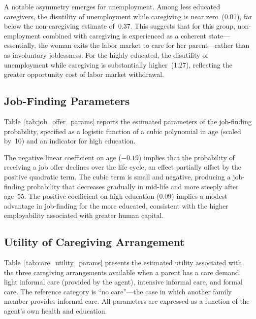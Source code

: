A notable asymmetry emerges for unemployment.  Among less educated
caregivers, the disutility of unemployment while caregiving is near
zero~(0.01), far below the non-caregiving estimate of~0.37.  This
suggests that for this group, non-employment combined with caregiving
is experienced as a coherent state---essentially, the woman exits the
labor market to care for her parent---rather than as involuntary
joblessness.  For the highly educated, the disutility of unemployment
while caregiving is substantially higher~(1.27), reflecting the
greater opportunity cost of labor market withdrawal.




\subsection{Job-Finding Parameters}
\label{sec:results_job_finding}

Table~\ref{tab:job_offer_params} reports the estimated parameters of
the job-finding probability, specified as a logistic function of a
cubic polynomial in age (scaled by~10) and an indicator for high
education.

The negative linear coefficient on age ($-0.19$) implies that the
probability of receiving a job offer declines over the life cycle, an
effect partially offset by the positive quadratic term.  The cubic
term is small and negative, producing a job-finding probability that
decreases gradually in mid-life and more steeply after age~55.  The
positive coefficient on high education ($0.09$) implies a modest
advantage in job-finding for the more educated, consistent with the
higher employability associated with greater human capital.




\subsection{Utility of Caregiving Arrangement}
\label{sec:results_care_utility}

Table~\ref{tab:care_utility_params} presents the estimated utility
associated with the three caregiving arrangements available when a
parent has a care demand: light informal care (provided by the agent),
intensive informal care, and formal care.  The reference category is
``no care''---the case in which another family member provides
informal care.  All parameters are expressed as a function of the
agent's own health and education.

